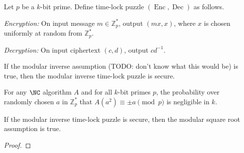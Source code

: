\documentclass{article}
\newcommand{\Enc}{\operatorname{Enc}}
\newcommand{\Dec}{\operatorname{Dec}}
\newcommand{\Zp}{\mathbb{Z}^*_p}
\begin{document}

\begin{protocol}
  Let $p$ be a $k$-bit prime.
  Define time-lock puzzle $(\Enc, \Dec)$ as follows.

  \emph{Encryption:} On input message $m \in \Zp$, output $(mx, x)$, where $x$ is chosen uniformly at random from $\Zp$.

  \emph{Decryption:} On input ciphertext $(c, d)$, output $cd^{-1}$.
\end{protocol}

\begin{conjecture}
  If the modular inverse assumption (TODO: don't know what this would be) is true, then the modular inverse time-lock puzzle is secure.
\end{conjecture}

\begin{assumption}
  For any $\NC$ algorithm $A$ and for all $k$-bit primes $p$, the probability over randomly chosen $a$ in $\Zp$ that $A(a^2) \equiv \pm a \pmod{p}$ is negligible in $k$.
\end{assumption}

\begin{conjecture}
  If the modular inverse time-lock puzzle is secure, then the modular square root assumption is true.
\end{conjecture}
\begin{proof}
\end{proof}
\end{document}
